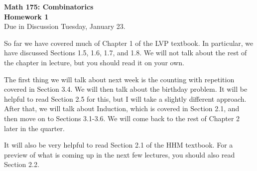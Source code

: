\documentclass[11pt]{article}
\begin{document}
\begin{center}
{\Large \bf Math 175: Combinatorics} \\
{\Large \bf Homework 1}\\
{\Large Due in Discussion Tuesday, January 23. \\
}
\end{center}

\vspace{5mm}

So far we have covered much of Chapter 1 of the LVP textbook.  In particular, we have discussed Sections 1.5, 1.6, 1.7, and 1.8.  We will not talk about the rest of the chapter in lecture, but you should read it on your own.  

The first thing we will talk about next week is the counting with repetition covered in Section 3.4.  We will then talk about the birthday problem.  It will be helpful to read Section 2.5 for this, but I will take a slightly different approach.  After that, we will talk about Induction, which is covered in Section 2.1, and then move on to Sections 3.1-3.6.  We will come back to the rest of Chapter 2 later in the quarter.  

It will also be very helpful to read Section 2.1 of the HHM textbook.  For a preview of what is coming up in the next few lectures, you should also read Section 2.2.
\end{document}
